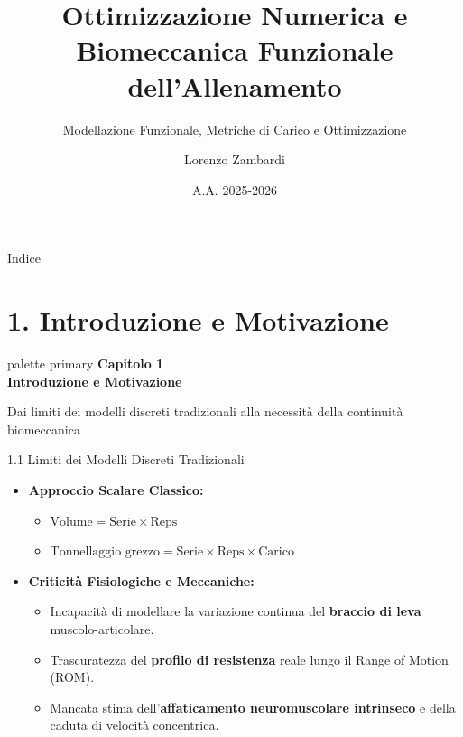 \documentclass[aspectratio=169, 10pt]{beamer}
\title[Iron Stats]{Ottimizzazione Numerica e Biomeccanica Funzionale dell'Allenamento}
\subtitle{Modellazione Funzionale, Metriche di Carico e Ottimizzazione}
\author{Lorenzo Zambardi}
\date{A.A. 2025-2026}
\begin{document}
\begin{frame}
    \titlepage
\end{frame}

\begin{frame}{Indice}
    \tableofcontents
\end{frame}

\section{1. Introduzione e Motivazione}

\begin{frame}
    \vfill
    \centering
    \begin{beamercolorbox}[sep=10pt,center,shadow=true,rounded=true]{palette primary}
        {\Huge \textbf{Capitolo 1}}\\[0.3cm]
        {\LARGE \textbf{Introduzione e Motivazione}}
    \end{beamercolorbox}
    \vspace{0.4cm}
    {\normalsize \textcolor{secondaryColor}{Dai limiti dei modelli discreti tradizionali alla necessità della continuità biomeccanica}}
    \vfill
\end{frame}

\begin{frame}{1.1 Limiti dei Modelli Discreti Tradizionali}
    \begin{itemize}
        \item \textbf{Approccio Scalare Classico:}
        \begin{itemize}
            \item $\text{Volume} = \text{Serie} \times \text{Reps}$
            \item $\text{Tonnellaggio grezzo} = \text{Serie} \times \text{Reps} \times \text{Carico}$
        \end{itemize}
        \vspace{0.3cm}
        \item \textbf{Criticità Fisiologiche e Meccaniche:}
        \begin{itemize}
            \item Incapacità di modellare la variazione continua del \textbf{braccio di leva} muscolo-articolare.
            \item Trascuratezza del \textbf{profilo di resistenza} reale lungo il Range of Motion (ROM).
            \item Mancata stima dell'\textbf{affaticamento neuromuscolare intrinseco} e della caduta di velocità concentrica.
        \end{itemize}
    \end{itemize}
\end{frame}
\end{document}
